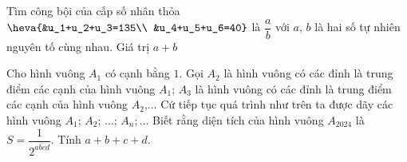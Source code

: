 \begin{ex}%
	Tìm công bội của cấp số nhân thỏa $\heva{&u_1+u_2+u_3=135\\ &u_4+u_5+u_6=40}$ là $\dfrac{a}{b}$ với $a$, $b$ là hai số tự nhiên nguyên  tố cùng nhau. Giá trị $a+b$
\end{ex}

\begin{ex}%
	Cho hình vuông $A_1$ có cạnh  bằng $ 1$. Gọi $A_2$ là hình vuông có các đỉnh là trung điểm các cạnh của hình vuông $A_1$; $A_3$ là hình vuông có các đỉnh là trung điểm các cạnh của hình vuông $A_2$,... Cứ tiếp tục quá trình như trên ta được dãy các hình vuông $A_1;\,A_2;\,...;\,A_n;...$ Biết rằng diện tích của hình vuông $A_{2024}$ là $S=\dfrac{1}{2^{\overline{abcd}}}$. Tính $a+b+c+d$.
\end{ex}

